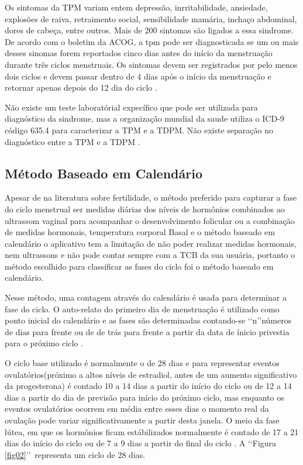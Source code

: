 Os sintomas da TPM variam entem depressão, inrritabilidade, ansiedade, explosões de raiva, retraimento social, sensibilidade mamária, inchaço abdominal, dores de cabeça, entre outros. Mais de 200 sintomas são ligados a essa sindrome. De acordo com o boletim da ACOG, a tpm pode ser diagnosticada se um ou mais desses sinomas forem reportados cinco dias antes do início da menstruação durante três ciclos menstruais. Os sintomas devem ser registrados por pelo menos dois ciclos e devem passar dentro de 4 dias após o início da menstruação e retornar apenas depois do 12 dia do ciclo \cite{ACOG2000}.

Não existe um teste laboratórial expecífico que pode ser utilizada para diagnóstico da sindrome, mas a organização mundial da saude utiliza o ICD-9 código 635.4 para caracterizar a TPM e a TDPM. Não existe separação no diagnóstico entre a TPM e a TDPM \cite{biggs2011}.

\subsection{Método Baseado em Calendário}

Apesar de na literatura sobre fertilidade, o método preferido para capturar a fase do ciclo menstrual ser medidas diárias dos níveis de hormônios combinados ao ultrassom vaginal para acompanhar o desenvolvimento folicular \cite{ecochard2001} ou a combinação de medidas hormonais, temperatura corporal Basal e o método baseado em calendário \cite{becker2005} o aplicativo tem a limitação de não poder realizar medidas hormonais, nem ultrassons e não pode contar sempre com a TCB da sua usuária, portanto o método escolhido para classificar as fases do ciclo foi o método baseado em calendário.

Nesse método, uma contagem através do calendário é usada para determinar a fase do ciclo. O auto-relato do primeiro dia de menstruação é utilizado como ponto inicial do calendário e as fases são determinadas contando-se \lq \lq n\rq \rq  números de dias para frente ou de de trás para frente a partir da data de ínicio privestia para o próximo ciclo \cite{wideman2013}.

O ciclo base utilizado é normalmente o de 28 dias e para representar eventos ovulatórios(próximo a altos níveis de estradiol, antes de um aumento significativo da progesterona) é contado 10 a 14 dias a partir do início do ciclo ou de 12 a 14 dias a partir do dia de previsão para início do próximo ciclo, mas enquanto os eventos ovulatórios ocorrem em média entre esses dias o momento real da ovulação pode variar significativamente a partir desta janela. O meio da fase lútea, em que os hormônios ficam estábilizados normalmente é contado de 17 a 21 dias do início do ciclo ou de 7 a 9 dias a partir do final do ciclo \cite{wideman2013}. A \lq\lq Figura \ref{fig02}\rq\rq\ representa um ciclo de 28 dias.

